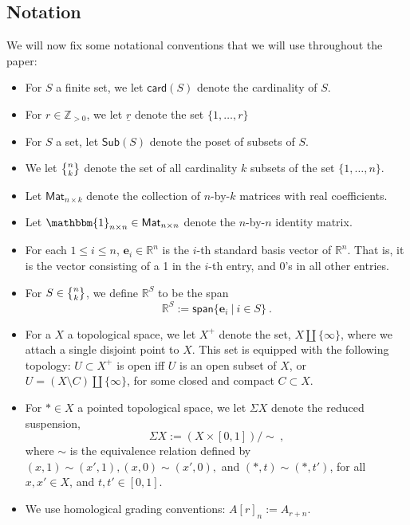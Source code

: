 \documentclass{article}
\newcommand{\bb}[1]{\mathbb{#1}}
\newcommand{\msf}[1]{\mathsf{#1}}
\newcommand{\mbf}[1]{\mathbf{#1}}
\newcommand{\spn}{\msf{span}}
\newcommand{\nchoosek}{\textstyle\genfrac{\lbrace}{\rbrace}{0pt}{}}
\newcommand{\uno}{\mathbbm{1}}
\newcommand{\card}{\msf{card}}
\newcommand{\mat}{\msf{Mat}}
\newcommand{\Sub}{\msf{Sub}}
\newcommand{\e}{\mbf{e}}
\theoremstyle{definition}
\begin{document}
\subsection{Notation}
We will now fix some notational conventions that we will use throughout the paper:
\begin{itemize}
    \item For $S$ a finite set, we let $\card(S)$ denote the cardinality of $S$.
    \item For $r\in \bb{Z}_{>0}$, we let $\underline{r}$ denote the set $\{1, \dots, r\}$
    \item For $S$ a set, let $\Sub(S)$ denote the poset of subsets of $S$.
    \item We let $\nchoosek{n}{k}$ denote the set of all cardinality $k$ subsets of the set $\{1, \dots, n\}$.  
    \item Let $\mat_{n \times k}$ denote the collection of $n$-by-$k$ matrices with real coefficients.
    \item Let $\uno_{n\times n}\in \mat_{n \times n}$ denote the $n$-by-$n$ identity matrix.
    \item For each $1\le i \le n$, $\e_i \in \bb{R}^n$ is the $i$-th standard basis vector of $\bb{R}^n$. 
        That is, it is the vector consisting of a 1 in the $i$-th entry, and 0's in all other entries.
    \item For $S \in \nchoosek{n}{k}$, we define $\bb{R}^S$ to be the span
        $$\bb{R}^S := \spn\{\e_i ~|~ i \in S\}~.$$
    \item For a $X$ a topological space, we let $X^+$ denote the set, $X \amalg \{\infty\}$, where we attach a
        single disjoint point to $X$. This set is equipped with the following topology: $U \subset X^+$ is open
        iff $U$ is an open subset of $X$, or $U = (X \setminus C) \amalg \{\infty\}$, for some closed and compact
        $C \subset X$.
    \item For $\ast \in X$ a pointed topological space, we let $\Sigma X$ denote the reduced suspension,
        $$\Sigma X := (X \times [0,1])/\sim~,$$
        where $\sim$ is the equivalence relation defined by $(x,1) \sim (x',1), (x,0) \sim (x',0),$ and 
        $(\ast, t) \sim (\ast,t')$, for all $x,x' \in X$, and $t,t' \in [0,1]$.
    \item We use homological grading conventions: $A[r]_n := A_{r+n}$.
\end{itemize}
\end{document}
